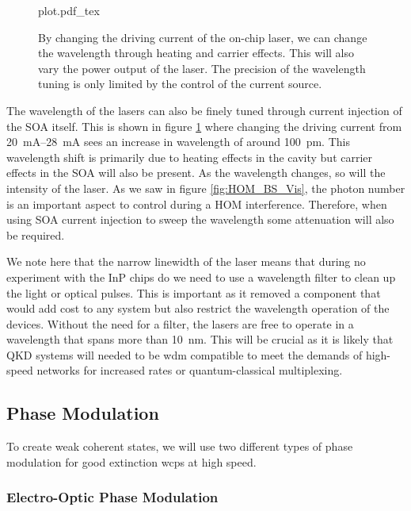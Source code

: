 \begin{figure}[tp]
	\centering
	\small	
	\def\svgwidth{0.9\textwidth} 
	{plot.pdf_tex}
	\caption[Laser wavelength current-injection sweep]{By changing the driving current of the on-chip laser, we can change the wavelength through heating and carrier effects. This will also vary the power output of the laser. The precision of the wavelength tuning is only limited by the control of the current source.}
	\label{fig:curr_sweep}
\end{figure}

\begin{parahigh}
The wavelength of the lasers can also be finely tuned through current injection of the \ac{SOA} itself. This is shown in figure \ref{fig:curr_sweep} where changing the driving current from \SIrange{20}{28}{mA} sees an increase in wavelength of around \SI{100}{pm}. This wavelength shift is primarily due to heating effects in the cavity but carrier effects in the \ac{SOA} will also be present. As the wavelength changes, so will the intensity of the laser. As we saw in figure \ref{fig:HOM_BS_Vis}, the photon number is an important aspect to control during a \ac{HOM} interference. Therefore, when using \ac{SOA} current injection to sweep the wavelength some attenuation will also be required.
 \end{parahigh}

We note here that the narrow linewidth of the laser means that during no experiment with the \ac{InP} chips do we need to use a wavelength filter to clean up the light or optical pulses. This is important as it removed a component that would add cost to any system but also restrict the wavelength operation of the devices. Without the need for a filter, the lasers are free to operate in a wavelength that spans more than \SI{10}{nm}. This will be crucial as it is likely that \ac{QKD} systems will needed to be \ac{wdm} compatible to meet the demands of high-speed networks for increased rates or quantum-classical multiplexing.

\subsection{Phase Modulation}

To create weak coherent states, we will use two different types of phase modulation for good extinction \acp{wcp} at high speed. 

\subsubsection{Electro-Optic Phase Modulation}

